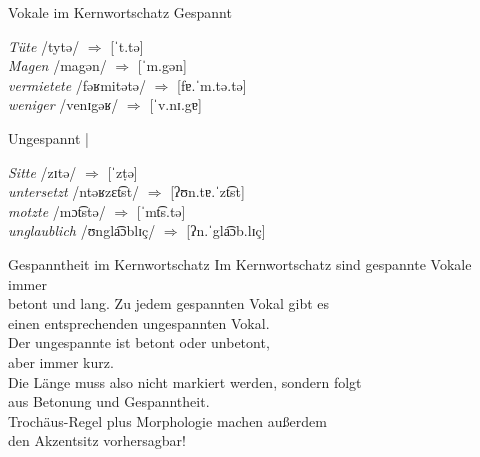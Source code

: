 \begin{frame}
  {Vokale im Kernwortschatz}
  \onslide<+->
  \onslide<+->
  \alert{Gespannt} \\
  \Viertelzeile
  \onslide<+->
  \begin{exe}
    \ex \textit{Tüte} /t\alert{y}tə/ $\Rightarrow$ [ˈt.tə]\\
    \ex \textit{Magen} /m\alert{a}gən/ $\Rightarrow$ [ˈm.gən]\\
    \ex \textit{vermietete} /fəʁm\alert{i}tətə/ $\Rightarrow$ [fɐ.ˈm.tə.tə]\\
    \ex \textit{weniger} /v\alert{e}nɪgəʁ/ $\Rightarrow$ [ˈv.nɪ.gɐ]\\
  \end{exe}
  \onslide<+->
  \Zeile
  \alert{Ungespannt} |  \\
  \Viertelzeile
  \begin{exe}
    \ex \textit{Sitte} /z\alert{ɪ}tə/ $\Rightarrow$ [ˈzṭə]\\
    \ex \textit{untersetzt} /ntəʁz\alert{ɛ}t͡st/ $\Rightarrow$ [ʔʊn.tɐ.ˈzt͡st]\\
    \ex \textit{motzte} /m\alert{ɔ}t͡stə/ $\Rightarrow$ [ˈmt͡s.tə]\\
    \ex \textit{unglaublich} /\alert{ʊ}ngla͡ɔblɪç/ $\Rightarrow$ [ʔn.ˈgla͡ɔb.lɪç]\\
  \end{exe}
\end{frame}

\begin{frame}
  {Gespanntheit im Kernwortschatz}
  \onslide<+->
  \onslide<+->
  \large
  \alert{Im Kernwortschatz sind gespannte Vokale immer\\
  betont und lang.} Zu jedem gespannten Vokal gibt es\\
  einen entsprechenden ungespannten Vokal.\\
  Der ungespannte ist betont oder unbetont,\\
  aber immer kurz.\\
  \Zeile
  \onslide<+->
  Die Länge muss also nicht markiert werden, sondern folgt\\
  aus Betonung und Gespanntheit.\\
  \Zeile
  \onslide<+->
  Trochäus-Regel plus Morphologie machen außerdem\\
  den Akzentsitz vorhersagbar!
\end{frame}

